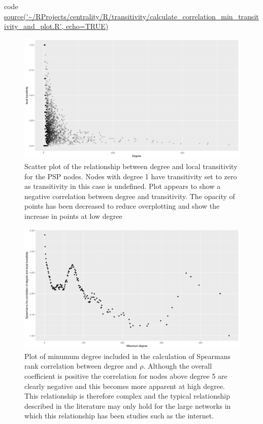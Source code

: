 code \url{source('~/RProjects/centrality/R/transitivity/calculate_correlation_min_transitivity_and_plot.R', echo=TRUE)}

\begin{figure}
    \centering
    \includegraphics[width=\textwidth]{images/Rplot02_degree_and_transitivity-change_alpha.png}
    \caption{Scatter plot of the relationship between degree and local transitivity for the PSP nodes. Nodes with degree 1 have transitivity set to zero as transitivity in this case is undefined. Plot appears to show a negative correlation between degree and transitivity. The opacity of points has been decreased to reduce overplotting and show the increase in points at low degree}
    \label{fig:Scatter plot of the relationship between degree and local transitivity for the PSP nodes}
\end{figure}
\begin{figure}
    \centering
    \includegraphics[width=\textwidth]{images/Rplot01_min_degree_transitivity.png}
    \caption{Plot of minumum degree included in the calculation of Spearmans rank correlation between degree and $\rho$. Although the overall coefficient is positive the correlation for nodes above degree 5 are clearly negative and this becomes more apparent at high degree. This relationship is therefore complex and the typical relationship described in the literature may only hold for the large networks in which this relationship has been studies such as the internet. }
    \label{fig:Plot of minumum degree included in the calculation of Spearmans rank correlation between degree and rho}
\end{figure}

